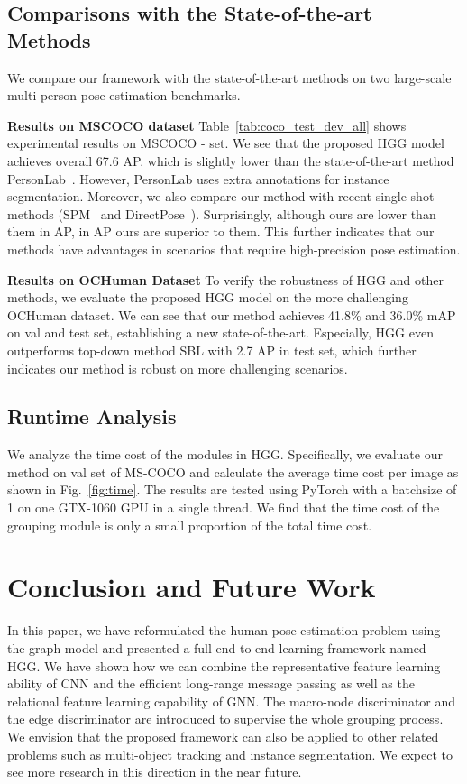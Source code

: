 \documentclass[runningheads]{llncs}
\begin{document}
	
	\subsection{Comparisons with the State-of-the-art Methods}
	We compare our framework with the state-of-the-art methods on two large-scale multi-person pose estimation benchmarks.
	
	\textbf{Results on MSCOCO dataset}
	Table~\ref{tab:coco_test_dev_all} shows experimental results on MSCOCO - set. We see that the proposed HGG model achieves overall 67.6 AP. which is slightly lower than the state-of-the-art method PersonLab~\cite{papandreou2018personlab}. However, PersonLab uses extra annotations for instance segmentation. 
	Moreover, we also compare our method with recent single-shot methods (SPM~\cite{nie2019single} and DirectPose~\cite{tian2019directpose}). Surprisingly, although ours are lower than them in AP, in AP ours are superior to them. This further indicates that our methods have advantages in scenarios that require high-precision pose estimation.
	
	\textbf{Results on OCHuman Dataset}
	To verify the robustness of HGG and other methods, we evaluate the proposed HGG model on the more challenging OCHuman dataset. We can see that our method achieves 41.8\% and 36.0\% mAP on val and test set, establishing a new state-of-the-art. Especially, HGG even outperforms top-down method SBL with 2.7 AP in test set, which further indicates our method is robust on more challenging scenarios.
	
	
	\subsection{Runtime Analysis}
	We analyze the time cost of the modules in HGG. Specifically, we evaluate our method on val set of MS-COCO and calculate the average time cost per image as shown in Fig.~\ref{fig:time}. The results are tested using PyTorch with a batchsize of 1 on one GTX-1060 GPU in a single thread. We find that the time cost of the grouping module is only a small proportion of the total time cost.
	
	\section{Conclusion and Future Work}
	\label{sec:conclusion}
	
	In this paper, we have reformulated the human pose estimation problem using the graph model and presented a full end-to-end learning framework named HGG. We have shown how we can combine the representative feature learning ability of CNN and the efficient long-range message passing as well as the relational feature learning capability of GNN. The macro-node discriminator and the edge discriminator are introduced to supervise the whole grouping process. We envision that the proposed framework can also be applied to other related problems such as multi-object tracking and instance segmentation. We expect to see more research in this direction in the near future.
	
\end{document}
